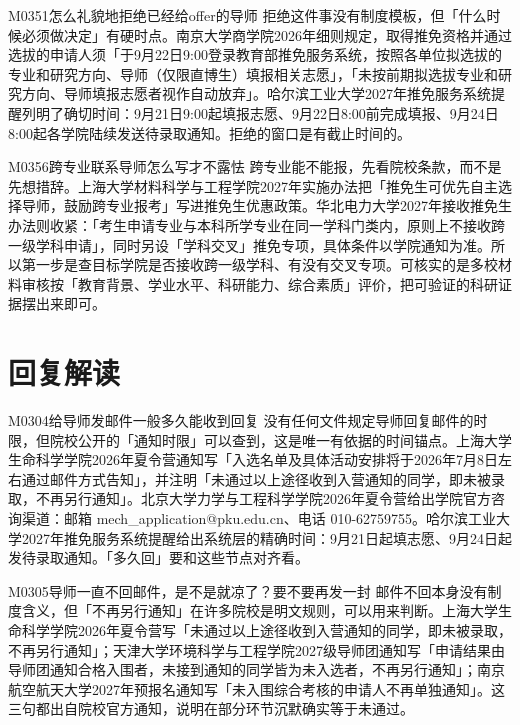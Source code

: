 \begin{qa}{M0351}{怎么礼貌地拒绝已经给offer的导师}
拒绝这件事没有制度模板，但「什么时候必须做决定」有硬时点。南京大学商学院2026年细则规定，取得推免资格并通过选拔的申请人须「于9月22日9:00登录教育部推免服务系统，按照各单位拟选拔的专业和研究方向、导师（仅限直博生）填报相关志愿」，「未按前期拟选拔专业和研究方向、导师填报志愿者视作自动放弃」。哈尔滨工业大学2027年推免服务系统提醒列明了确切时间：9月21日9:00起填报志愿、9月22日8:00前完成填报、9月24日8:00起各学院陆续发送待录取通知。拒绝的窗口是有截止时间的。
\end{qa}

\begin{qa}{M0356}{跨专业联系导师怎么写才不露怯}
跨专业能不能报，先看院校条款，而不是先想措辞。上海大学材料科学与工程学院2027年实施办法把「推免生可优先自主选择导师，鼓励跨专业报考」写进推免生优惠政策。华北电力大学2027年接收推免生办法则收紧：「考生申请专业与本科所学专业在同一学科门类内，原则上不接收跨一级学科申请」，同时另设「学科交叉」推免专项，具体条件以学院通知为准。所以第一步是查目标学院是否接收跨一级学科、有没有交叉专项。可核实的是多校材料审核按「教育背景、学业水平、科研能力、综合素质」评价，把可验证的科研证据摆出来即可。
\end{qa}

\section{回复解读}
\begin{qa}{M0304}{给导师发邮件一般多久能收到回复}
没有任何文件规定导师回复邮件的时限，但院校公开的「通知时限」可以查到，这是唯一有依据的时间锚点。上海大学生命科学学院2026年夏令营通知写「入选名单及具体活动安排将于2026年7月8日左右通过邮件方式告知」，并注明「未通过以上途径收到入营通知的同学，即未被录取，不再另行通知」。北京大学力学与工程科学学院2026年夏令营给出学院官方咨询渠道：邮箱 mech\_application@pku.edu.cn、电话 010-62759755。哈尔滨工业大学2027年推免服务系统提醒给出系统层的精确时间：9月21日起填志愿、9月24日起发待录取通知。「多久回」要和这些节点对齐看。
\end{qa}

\begin{qa}{M0305}{导师一直不回邮件，是不是就凉了？要不要再发一封}
邮件不回本身没有制度含义，但「不再另行通知」在许多院校是明文规则，可以用来判断。上海大学生命科学学院2026年夏令营写「未通过以上途径收到入营通知的同学，即未被录取，不再另行通知」；天津大学环境科学与工程学院2027级导师团通知写「申请结果由导师团通知合格入围者，未接到通知的同学皆为未入选者，不再另行通知」；南京航空航天大学2027年预报名通知写「未入围综合考核的申请人不再单独通知」。这三句都出自院校官方通知，说明在部分环节沉默确实等于未通过。
\end{qa}

